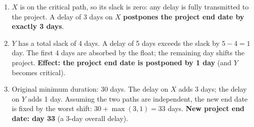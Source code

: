 \documentclass[11pt]{article}
\begin{document}
\begin{corrige}
\begin{enumerate}
\item $X$ is on the critical path, so its slack is zero: any delay is fully transmitted to the project. A delay of 3 days on $X$ \textbf{postpones the project end date by exactly 3 days}.
\item $Y$ has a total slack of 4 days. A delay of 5 days exceeds the slack by $5 - 4 = 1$ day. The first 4 days are absorbed by the float; the remaining day shifts the project. \textbf{Effect: the project end date is postponed by 1 day} (and $Y$ becomes critical).
\item Original minimum duration: 30 days. The delay on $X$ adds 3 days; the delay on $Y$ adds 1 day. Assuming the two paths are independent, the new end date is fixed by the worst shift: $30 + \max(3, 1) = 33$ days. \textbf{New project end date: day 33} (a 3-day overall delay).
\end{enumerate}
\end{corrige}
\end{document}
